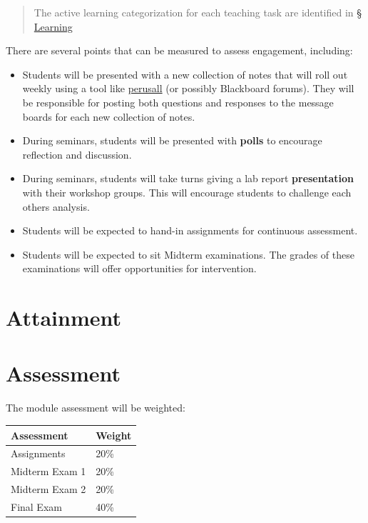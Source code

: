\documentclass[
]{article}
\providecommand{\tightlist}{%
  \setlength{\itemsep}{0pt}\setlength{\parskip}{0pt}}
\begin{document}
\begin{quote}
The active learning categorization for each teaching task are identified in \protect\hyperlink{learning}{§ Learning}
\end{quote}

There are several points that can be measured to assess engagement, including:

\begin{itemize}
\tightlist
\item
  Students will be presented with a new collection of notes that will roll out weekly using a tool like \href{https://perusall.com/}{perusall} (or possibly Blackboard forums). They will be responsible for posting both questions and responses to the message boards for each new collection of notes.\\
\item
  During seminars, students will be presented with \textbf{polls} to encourage reflection and discussion.
\item
  During seminars, students will take turns giving a lab report \textbf{presentation} with their workshop groups. This will encourage students to challenge each others analysis.
\item
  Students will be expected to hand-in assignments for continuous assessment.
\item
  Students will be expected to sit Midterm examinations. The grades of these examinations will offer opportunities for intervention.
\end{itemize}

\hypertarget{attainment}{%
\section{Attainment}\label{attainment}}

\hypertarget{assessment}{%
\section{Assessment}\label{assessment}}

The module assessment will be weighted:

\begin{tabular}{l|l}
\hline
Assessment & Weight\\
\hline
Assignments & 20\%\\
\hline
Midterm Exam 1 & 20\%\\
\hline
Midterm Exam 2 & 20\%\\
\hline
Final Exam & 40\%\\
\hline
\end{tabular}
\end{document}

